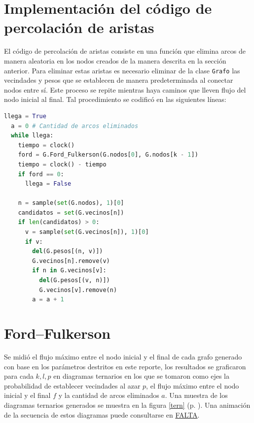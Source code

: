 \documentclass{article}
\begin{document}
  \section{Implementación del código de percolación de aristas}

  El código de percolación de aristas consiste en una función que elimina arcos de manera aleatoria en los nodos creados de la manera descrita en la sección anterior. Para eliminar estas aristas es necesario eliminar de la clase \texttt{Grafo} las vecindades y pesos que se establecen de manera predeterminada al conectar nodos entre sí. Este proceso se repite mientras haya caminos que lleven flujo del nodo inicial al final. Tal procedimiento se codificó en las siguientes líneas:

  \begin{lstlisting}[language = Python]
llega = True
  a = 0 # Cantidad de arcos eliminados
  while llega:
    tiempo = clock()
    ford = G.Ford_Fulkerson(G.nodos[0], G.nodos[k - 1])
    tiempo = clock() - tiempo
    if ford == 0:
      llega = False

    n = sample(set(G.nodos), 1)[0]
    candidatos = set(G.vecinos[n])
    if len(candidatos) > 0:
      v = sample(set(G.vecinos[n]), 1)[0]
      if v:
        del(G.pesos[(n, v)])
        G.vecinos[n].remove(v)
        if n in G.vecinos[v]:
          del(G.pesos[(v, n)])
          G.vecinos[v].remove(n)
        a = a + 1
  \end{lstlisting}

  \section{Ford--Fulkerson}

  Se midió el flujo máximo entre el nodo inicial y el final de cada grafo generado con base en los parámetros destritos en este reporte, los resultados se graficaron para cada $k, l, p$ en diagramas ternarios en los que se tomaron como ejes la probabilidad de establecer vecindades al azar $p$, el flujo máximo entre el nodo inicial y el final $f$ y la cantidad de arcos eliminados $a$. Una muestra de los diagramas ternarios generados se muestra en la figura \ref{tern} (p. \pageref{tern}). Una animación de la secuencia de estos diagramas puede consultarse en \url{FALTA}.
\end{document}
